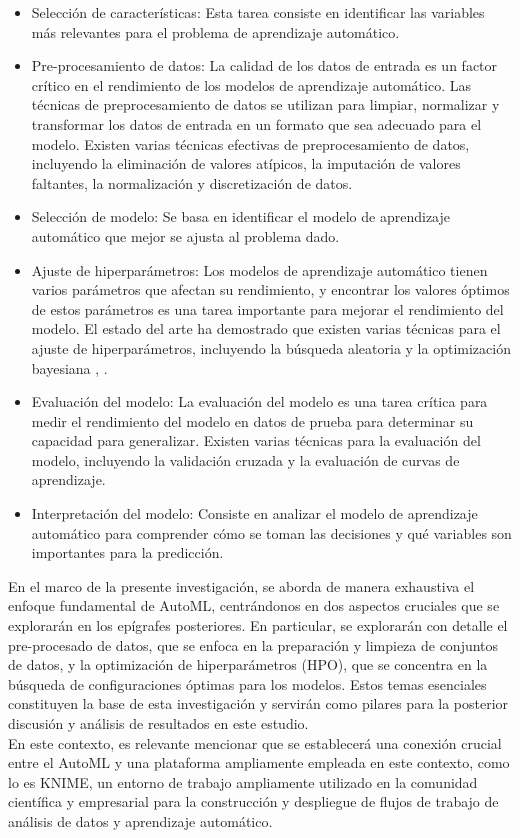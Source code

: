 \begin{itemize}
	\item Selección de características: Esta tarea consiste en identificar las variables más relevantes para el problema de aprendizaje automático. 
	\item Pre-procesamiento de datos: La calidad de los datos de entrada es un factor crítico en el rendimiento de los modelos de aprendizaje automático. Las técnicas de preprocesamiento de datos se utilizan para limpiar, normalizar y transformar los datos de entrada en un formato que sea adecuado para el modelo. Existen varias técnicas efectivas de preprocesamiento de datos, incluyendo la eliminación de valores atípicos, la imputación de valores faltantes, la normalización y discretización de datos.
	\item Selección de modelo: Se basa en identificar el modelo de aprendizaje automático que mejor se ajusta al problema dado.
	\item Ajuste de hiperparámetros: Los modelos de aprendizaje automático tienen varios parámetros que afectan su rendimiento, y encontrar los valores óptimos de estos parámetros es una tarea importante para mejorar el rendimiento del modelo. El estado del arte ha demostrado que existen varias técnicas para el ajuste de hiperparámetros, incluyendo la búsqueda aleatoria \citep{zoller2021benchmark} y la optimización bayesiana \citep{he2021automl}, \citep{hutter2019automated}.
	\item Evaluación del modelo: La evaluación del modelo es una tarea crítica para medir el rendimiento del modelo en datos de prueba para determinar su capacidad para generalizar. Existen varias técnicas para la evaluación del modelo, incluyendo la validación cruzada y la evaluación de curvas de aprendizaje.
	\item Interpretación del modelo: Consiste en analizar el modelo de aprendizaje automático para comprender cómo se toman las decisiones y qué variables son importantes para la predicción.
\end{itemize}

En el marco de la presente investigación, se aborda de manera exhaustiva el enfoque fundamental de AutoML, centrándonos en dos aspectos cruciales que se explorarán en los epígrafes posteriores. En particular, se explorarán con detalle el pre-procesado de datos, que se enfoca en la preparación y limpieza de conjuntos de datos, y la optimización de hiperparámetros (HPO), que se concentra en la búsqueda de configuraciones óptimas para los modelos. Estos temas esenciales constituyen la base de esta investigación y servirán como pilares para la posterior discusión y análisis de resultados en este estudio. \\
En este contexto, es relevante mencionar que se establecerá una conexión crucial entre el AutoML y una plataforma  ampliamente empleada en este contexto, como lo es KNIME, un entorno de trabajo ampliamente utilizado en la comunidad científica y empresarial para la construcción y despliegue de flujos de trabajo de análisis de datos y aprendizaje automático. 


